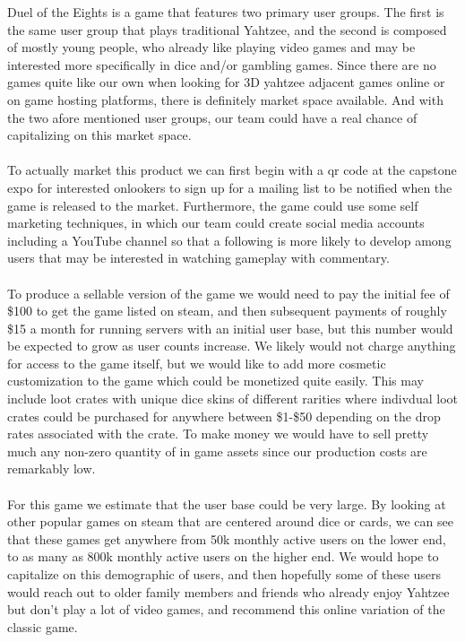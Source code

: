 \documentclass{article}
\begin{document}

Duel of the Eights is a game that features two primary user groups. The first is the same user group that plays traditional Yahtzee, and the second is composed of mostly young people, who already like playing video games and may be interested more specifically in dice and/or gambling games. Since there are no games quite like our own when looking for 3D yahtzee adjacent games online or on game hosting platforms, there is definitely market space available. And with the two afore mentioned user groups, our team could have a real chance of capitalizing on this market space.
\\
\\
To actually market this product we can first begin with a qr code at the capstone expo for interested onlookers to sign up for a mailing list to be notified when the game is released to the market. Furthermore, the game could use some self marketing techniques, in which our team could create social media accounts including a YouTube channel so that a following is more likely to develop among users that may be interested in watching gameplay with commentary.
\\
\\
To produce a sellable version of the game we would need to pay the initial fee of \$100 to get the game listed on steam, and then subsequent payments of roughly \$15 a month for running servers with an initial user base, but this number would be expected to grow as user counts increase. We likely would not charge anything for access to the game itself, but we would like to add more cosmetic customization to the game which could be monetized quite easily. This may include loot crates with unique dice skins of different rarities where indivdual loot crates could be purchased for anywhere between \$1-\$50 depending on the drop rates associated with the crate. To make money we would have to sell pretty much any non-zero quantity of in game assets since our production costs are remarkably low.
\\
\\
For this game we estimate that the user base could be very large. By looking at other popular games on steam that are centered around dice or cards, we can see that these games get anywhere from 50k monthly active users on the lower end, to as many as 800k monthly active users on the higher end. We would hope to capitalize on this demographic of users, and then hopefully some of these users would reach out to older family members and friends who already enjoy Yahtzee but don't play a lot of video games, and recommend this online variation of the classic game.
\end{document}
